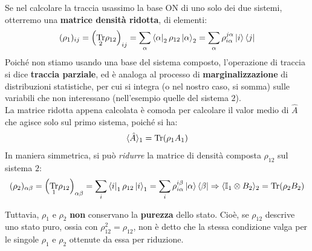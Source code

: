 \documentclass[../../InformazioneQuantistica.tex]{subfiles}
\begin{document}
Se nel calcolare la traccia usassimo la base ON di uno solo dei due sistemi, otterremo una \textbf{matrice densità ridotta}, di elementi:
\begin{align*}
(\rho_1)_{ij} = \left(\underset{2}{\operatorname{Tr}}\rho_{12}\right)_{ij} =\sum_\alpha \Bra{\alpha}_2 \rho_{12}\Ket{\alpha}_2 = \sum_\alpha \rho_{i\alpha}^{j\alpha} \Ket{i}\Bra{j}
\end{align*}
Poiché non stiamo usando una base del sistema composto, l'operazione di traccia si dice \textbf{traccia parziale}, ed è analoga al processo di \textbf{marginalizzazione} di distribuzioni statistiche, per cui si integra (o nel nostro caso, si somma) sulle variabili che non interessano (nell'esempio quelle del sistema $2$).\\
La matrice ridotta appena calcolata è comoda per calcolare il valor medio di $\hat{A}$ che agisce solo sul primo sistema, poiché si ha:
\begin{align*}
\langle \hat{A}\rangle_1 = \operatorname{Tr}(\rho_1 A_1)
\end{align*}
In maniera simmetrica, si può \textit{ridurre} la matrice di densità composta $\rho_{12}$ sul sistema $2$:
\begin{align*}
(\rho_2)_{\alpha\beta}= \left(\underset{1}{\operatorname{Tr}} \rho_{12}\right)_{\alpha\beta} = \sum_i \Bra{i}_1 \rho_{12}\Ket{i}_1 = \sum_i \rho_{i\alpha}^{i\beta} \Ket{\alpha}\Bra{\beta} \Rightarrow  \langle \mathbb{I}_1\otimes {B}_2\rangle_2 = \operatorname{Tr}(\rho_2 B_2)
\end{align*}

Tuttavia, $\rho_1$ e $\rho_2$ \textbf{non} conservano la \textbf{purezza} dello stato. Cioè, se $\rho_{12}$ descrive uno stato puro, ossia con $\rho_{12}^2 = \rho_{12}$, non è detto che la stessa condizione valga per le singole $\rho_1$ e $\rho_2$ ottenute da essa per riduzione.
\end{document}
